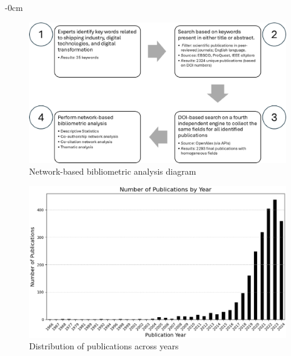 \documentclass[jmse,review,submit,pdftex,moreauthors]{Definitions/mdpi}
\begin{document}
\begin{adjustwidth}{-\extralength}{0cm}
\begin{figure}[H]
	\centering
	\includegraphics[width=\linewidth]{pics/overall_diagram.eps}
	\caption{Network-based bibliometric analysis diagram}\label{fig:fig0}
\end{figure}

\begin{figure}[H]
	\centering
	\includegraphics[width=\linewidth]{pics/no_publications_year.eps}
	\caption{Distribution of publications across years}\label{fig:fig1}
\end{figure}


\end{adjustwidth}
\end{document}

